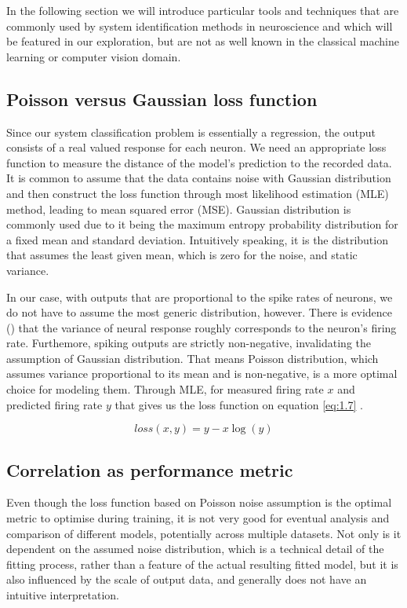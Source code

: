 In the following section we will introduce particular tools and techniques that are commonly used by system identification methods in neuroscience and which will be featured in our exploration, but are not as well known in the classical machine learning or computer vision domain. 

\subsection{Poisson versus Gaussian loss function}\label{ch:1.4.1}

Since our system classification problem is essentially a regression, the output consists of a real valued response for each neuron. We need an appropriate loss function to measure the distance of the model’s prediction to the recorded data. It is common to assume that the data contains noise with Gaussian distribution and then construct the loss function through most likelihood estimation (MLE) method, leading to mean squared error (MSE). Gaussian distribution is commonly used due to it being the maximum entropy probability distribution for a fixed mean and standard deviation. Intuitively speaking, it is the distribution that assumes the least given mean, which is zero for the noise, and static variance.

In our case, with outputs that are proportional to the spike rates of neurons, we do not have to assume the most generic distribution, however. There is evidence (\citep{Goris2014}) that the variance of neural response roughly corresponds to the neuron’s firing rate. Furthemore, spiking outputs are strictly non-negative, invalidating the assumption of Gaussian distribution. That means Poisson distribution, which assumes variance proportional to its mean and is non-negative, is a more optimal choice for modeling them. Through MLE, for measured firing rate $x$ and predicted firing rate $y$ that gives us the loss function on equation \ref{eq:1.7} .

\begin{equation}\label{eq:1.7}
    loss(x,y)=y-x\log{(y)}
\end{equation}

\subsection{Correlation as performance metric}\label{ch:1.4.2}

Even though the loss function based on Poisson noise assumption is the optimal metric to optimise during training, it is not very good for eventual analysis and comparison of different models, potentially across multiple datasets. Not only is it dependent on the assumed noise distribution, which is a technical detail of the fitting process, rather than a feature of the actual resulting fitted model, but it is also influenced by the scale of output data, and generally does not have an intuitive interpretation.

